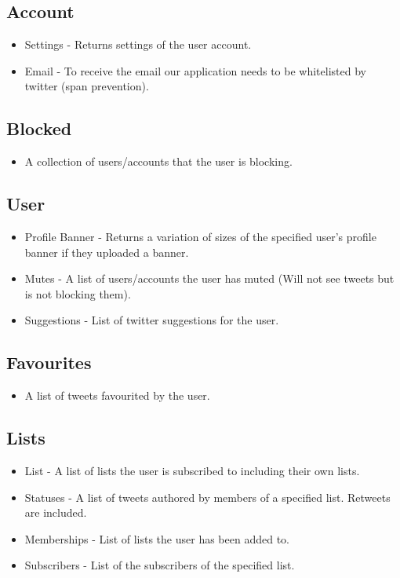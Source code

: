 \documentclass{article}
\begin{document}
	\subsection{Account}
	\begin{itemize}
		\item{Settings} - Returns settings of the user account.
		\item{Email} - To receive the email our application needs to be whitelisted by twitter (span prevention).
	\end{itemize}
	\subsection{Blocked}
	\begin{itemize}
		\item A collection of users/accounts that the user is blocking.
	\end{itemize}
	\subsection{User}
	\begin{itemize}
		\item{Profile Banner} - Returns a variation of sizes of the specified user's profile banner if they uploaded a banner.

		\item{Mutes} - A list of users/accounts the user has muted (Will not see tweets but is not blocking them).

		\item{Suggestions} - List of twitter suggestions for the user.
	\end{itemize}
	\subsection{Favourites}
	\begin{itemize}
		\item A list of tweets favourited by the user.
	\end{itemize}
	\subsection{Lists}
	\begin{itemize}
		\item{List} - A list of lists the user is subscribed to including their own lists.

		\item{Statuses} - A list of tweets authored by members of a specified list. Retweets are included.

		\item{Memberships} - List of lists the user has been added to.

		\item{Subscribers} - List of the subscribers of the specified list.
	\end{itemize}
\end{document}

